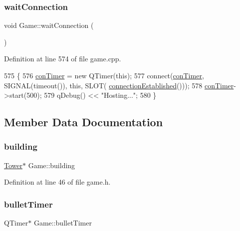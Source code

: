 \subsubsection{\texorpdfstring{wait\+Connection}{waitConnection}}
{\footnotesize\ttfamily void Game\+::wait\+Connection (\begin{DoxyParamCaption}{ }\end{DoxyParamCaption})\hspace{0.3cm}{\ttfamily [slot]}}



Definition at line 574 of file game.\+cpp.


\begin{DoxyCode}
575 \{
576     \hyperlink{class_game_a266d51c575b09c22aac86e20487802f4}{conTimer} = \textcolor{keyword}{new} QTimer(\textcolor{keyword}{this});
577     connect(\hyperlink{class_game_a266d51c575b09c22aac86e20487802f4}{conTimer}, SIGNAL(timeout()), \textcolor{keyword}{this}, SLOT(
      \hyperlink{class_game_a480aa57ccdd02118f7716b4870a2b47c}{connectionEstablished}()));
578     \hyperlink{class_game_a266d51c575b09c22aac86e20487802f4}{conTimer}->start(500);
579     qDebug() << \textcolor{stringliteral}{"Hosting..."};
580 \}
\end{DoxyCode}


\subsection{Member Data Documentation}
\mbox{\label{class_game_a5917b4e021a93be7666ebc2ef4529401}} 
\subsubsection{\texorpdfstring{building}{building}}
{\footnotesize\ttfamily \hyperlink{class_tower}{Tower}$\ast$ Game\+::building}



Definition at line 46 of file game.\+h.

\mbox{\label{class_game_a4774e6e02e372dabcba313802800df5d}} 
\subsubsection{\texorpdfstring{bullet\+Timer}{bulletTimer}}
{\footnotesize\ttfamily Q\+Timer$\ast$ Game\+::bullet\+Timer}



